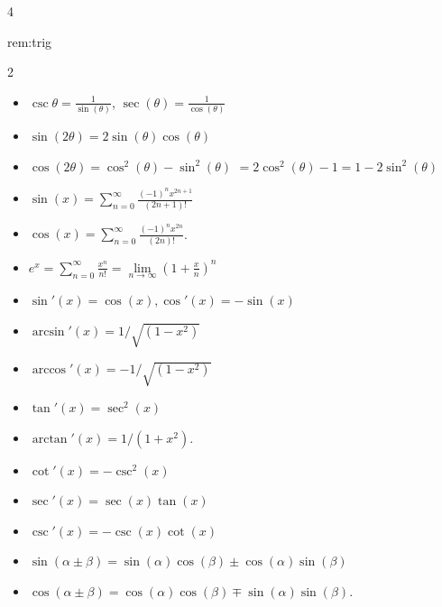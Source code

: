 \documentclass[landscape, 8pt]{extarticle}
\begin{document}
\begin{multicols*}{4}
		
		\begin{rem}{rem:trig}{ }
		\vspace{-4pt}
		\begin{multicols}{2}
			\begin{itemize}
				\item $\csc{\theta} = \frac{1}{\sin(\theta)}$, $\sec(\theta) = \frac{1}{\cos(\theta)}$
				\item $\sin(2\theta) = 2 \sin(\theta)\cos(\theta)$
				\item $\cos(2\theta) = \cos^2(\theta) - \sin^2(\theta)$   $= 2\cos^2(\theta) - 1 = 1 - 2\sin^2(\theta)$
				\item $\sin(x) = \sum_{n=0}^{\infty} \frac{(-1)^nx^{2n+1}}{(2n+1)!}$
				\item $\cos(x) = \sum_{n=0}^{\infty} \frac{(-1)^n x^{2n}}{(2n)!}$.
				\item $e^x = \sum_{n=0}^{\infty} \frac{x^n}{n!} = \lim\limits_{n\to \infty} (1 + \frac{x}{n})^n$
			\end{itemize}
			\columnbreak
			\begin{itemize}
				\item $\sin'(x) = \cos(x), \cos'(x) = -\sin(x)$
				\item $\arcsin'(x) = 1/\sqrt{(1-x^2)}$
				\item $\arccos'(x) = -1/\sqrt{(1-x^2)}$
				\item $\tan'(x) = \sec^2(x)$
				\item $\arctan'(x) = 1/(1+x^2)$.
				\item $\cot'(x) = -\csc^2(x)$
				\item $\sec'(x) = \sec(x)\tan(x)$
				\item $\csc'(x) = -\csc(x)\cot(x)$
				
			\end{itemize}
		\end{multicols}
		\vspace{3pt}
		\begin{itemize}
			\item $\sin(\alpha \pm \beta) = \sin(\alpha)\cos(\beta) \pm \cos(\alpha)\sin(\beta)$
			\item $\cos(\alpha \pm \beta) = \cos(\alpha)\cos(\beta) \mp \sin(\alpha)\sin(\beta)$.
		\end{itemize}
		
		\end{rem}
		

\end{multicols*}
\end{document}
